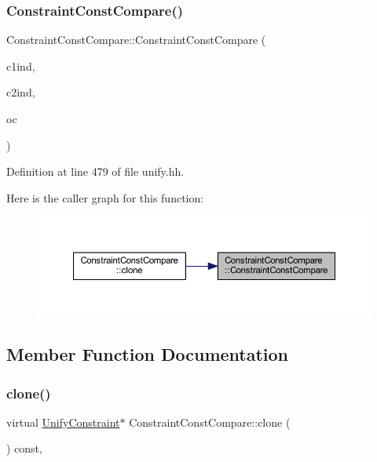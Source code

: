 \subsubsection{\texorpdfstring{ConstraintConstCompare()}{ConstraintConstCompare()}}
{\footnotesize\ttfamily Constraint\+Const\+Compare\+::\+Constraint\+Const\+Compare (\begin{DoxyParamCaption}\item[{int4}]{c1ind,  }\item[{int4}]{c2ind,  }\item[{\mbox{\hyperlink{opcodes_8hh_abeb7dfb0e9e2b3114e240a405d046ea7}{Op\+Code}}}]{oc }\end{DoxyParamCaption})\hspace{0.3cm}{\ttfamily [inline]}}



Definition at line 479 of file unify.\+hh.

Here is the caller graph for this function\+:
\nopagebreak
\begin{figure}[H]
\begin{center}
\leavevmode
\includegraphics[width=350pt]{class_constraint_const_compare_a74ba04e9ef1c6b960fc3a7eb63cc8e6d_icgraph}
\end{center}
\end{figure}


\subsection{Member Function Documentation}
\mbox{\label{class_constraint_const_compare_a6129d61238d6361ca597764c82e17f5a}} 
\subsubsection{\texorpdfstring{clone()}{clone()}}
{\footnotesize\ttfamily virtual \mbox{\hyperlink{class_unify_constraint}{Unify\+Constraint}}$\ast$ Constraint\+Const\+Compare\+::clone (\begin{DoxyParamCaption}\item[{void}]{ }\end{DoxyParamCaption}) const\hspace{0.3cm}{\ttfamily [inline]}, {\ttfamily [virtual]}}



